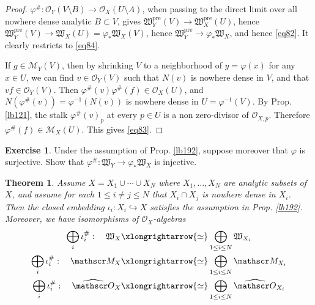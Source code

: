 \documentclass[12pt,b5paper,notitlepage]{report}
\theoremstyle{definition}
\newtheorem{exe}[df]{Exercise}
\theoremstyle{plain}
\newtheorem{thm}[df]{Theorem}
\newcommand{\fk}{\mathfrak}
\newcommand{\scr}{\mathscr}
\newcommand{\pre}{\mathrm{pre}}
\newcommand{\Owht}{\widehat{\scr O}}
\numberwithin{equation}{section}
\begin{document}
\begin{proof}
$\varphi^\#:\scr O_Y(V\setminus B)\rightarrow\scr O_X(U\setminus A)$, when passing to the direct limit over all nowhere dense analytic $B\subset V$, gives $\fk W_Y^\pre(V)\rightarrow\fk W_X^\pre(U)$, hence $\fk W_Y^\pre(V)\rightarrow\fk W_X(U)=\varphi_*\fk W_X(V)$, hence $\fk W_Y^\pre\rightarrow\varphi_*\fk W_X$, and hence \eqref{eq82}. It clearly restricts to \eqref{eq84}.

If $g\in\scr M_Y(V)$, then by shrinking $V$ to a neighborhood of $y=\varphi(x)$ for any $x\in U$, we can find $v\in\scr O_Y(V)$ such that $N(v)$ is nowhere dense in $V$, and that $vf\in\scr O_Y(V)$. Then $\varphi^\#(v)\varphi^\#(f)\in\scr O_X(U)$, and $N(\varphi^\#(v))=\varphi^{-1}(N(v))$ is nowhere dense in $U=\varphi^{-1}(V)$. By Prop. \ref{lb121}, the stalk $\varphi^\#(v)_p$ at every $p\in U$ is a non zero-divisor of $\scr O_{X,p}$. Therefore $\varphi^\#(f)\in\scr M_X(U)$. This gives \eqref{eq83}.
\end{proof}


\begin{exe}
Under the assumption of Prop. \ref{lb192}, suppose moreover that $\varphi$ is surjective. Show that $\varphi^\#:\fk W_Y\rightarrow\varphi_*\fk W_X$ is injective.
\end{exe}



\begin{thm}\label{lb217}
Assume $X=X_1\cup\cdots\cup X_N$ where $X_1,\dots,X_N$ are analytic subsets of $X$, and assume for each $1\leq i\neq j\leq N$ that $X_i\cap X_j$ is nowhere dense in $X_i$. Then the closed embedding $\iota_i:X_i\hookrightarrow X$ satisfies the assumption in Prop. \ref{lb192}. Moreover, we have isomorphisms of $\scr O_X$-algebras
\begin{subequations}\label{eq85}
\begin{gather}
\bigoplus_i\iota_i^\#:\quad\fk W_X\xlongrightarrow{\simeq}\bigoplus_{1\leq i\leq N}\fk W_{X_i}\label{eq89}\\
\bigoplus_i\iota_i^\#:\quad\scr M_X\xlongrightarrow{\simeq}\bigoplus_{1\leq i\leq N}\scr M_{X_i}\label{eq90}\\
\bigoplus_i\iota_i^\#:\quad\Owht_X\xlongrightarrow{\simeq}\bigoplus_{1\leq i\leq N}\Owht_{X_i}\label{eq91}
\end{gather}
\end{subequations}
\end{thm}
\end{document}
